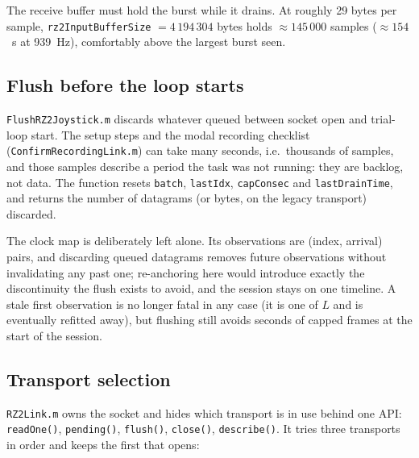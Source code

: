 \documentclass[11pt,a4paper]{article}
\newcommand{\code}[1]{\texttt{\small #1}}
\newcommand{\file}[1]{\texttt{\small #1}}
\begin{document}
The receive buffer must hold the burst while it drains. At roughly 29 bytes per
sample, \code{rz2InputBufferSize} $= 4\,194\,304$ bytes holds $\approx 145\,000$
samples ($\approx 154$~s at 939~Hz), comfortably above the largest burst seen.

\subsection{Flush before the loop starts}

\file{FlushRZ2Joystick.m} discards whatever queued between socket open and
trial-loop start. The setup steps and the modal recording checklist
(\file{ConfirmRecordingLink.m}) can take many seconds, i.e.\ thousands of
samples, and those samples describe a period the task was not running: they are
backlog, not data. The function resets \code{batch}, \code{lastIdx},
\code{capConsec} and \code{lastDrainTime}, and returns the number of datagrams
(or bytes, on the legacy transport) discarded.

The clock map is deliberately left alone. Its observations are (index, arrival)
pairs, and discarding queued datagrams removes future observations without
invalidating any past one; re-anchoring here would introduce exactly the
discontinuity the flush exists to avoid, and the session stays on one timeline.
A stale first observation is no longer fatal in any case (it is one of $L$ and
is eventually refitted away), but flushing still avoids seconds of capped frames
at the start of the session.

\subsection{Transport selection}
\label{sec:link}

\file{RZ2Link.m} owns the socket and hides which transport is in use behind one
API: \code{readOne()}, \code{pending()}, \code{flush()}, \code{close()},
\code{describe()}. It tries three transports in order and keeps the first that
opens:
\end{document}
